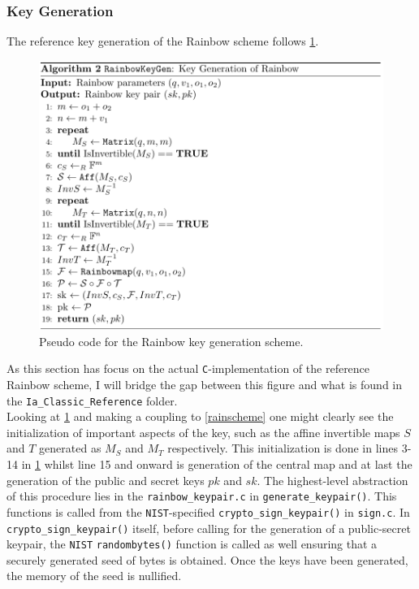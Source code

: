 \subsubsection{Key Generation} \label{section:keygen}
The reference key generation of the Rainbow scheme follows \cref{rainbowkeygen}.
\begin{figure}[t]
    \centering
    \includegraphics[width=\textwidth]{resources/rainbowkeygen.png}
    \caption{Pseudo code for the Rainbow key generation scheme.}
    \label{rainbowkeygen}
\end{figure}
As this section has focus on the actual \texttt{C}-implementation of the reference Rainbow scheme, I will bridge the gap between this figure and what is found in the \texttt{Ia\_Classic\_Reference} folder.\medskip\\
Looking at \cref{rainbowkeygen} and making a coupling to \cref{rainscheme} one might clearly see the initialization of important aspects of the key, such as the affine invertible maps $S$ and $T$ generated as $M_S$ and $M_T$ respectively. This initialization is done in lines 3-14 in \cref{rainbowkeygen} whilst line 15 and onward is generation of the central map and at last the generation of the public and secret keys $pk$ and $sk$. The highest-level abstraction of this procedure lies in the \texttt{rainbow\_keypair.c} in \texttt{generate\_keypair()}. This functions is called from the \texttt{NIST}-specified \texttt{crypto\_sign\_keypair()} in \texttt{sign.c}. In \texttt{crypto\_sign\_keypair()} itself, before calling for the generation of a public-secret keypair, the \texttt{NIST} \texttt{randombytes()} function is called as well ensuring that a securely generated seed of bytes is obtained. Once the keys have been generated, the memory of the seed is nullified.
